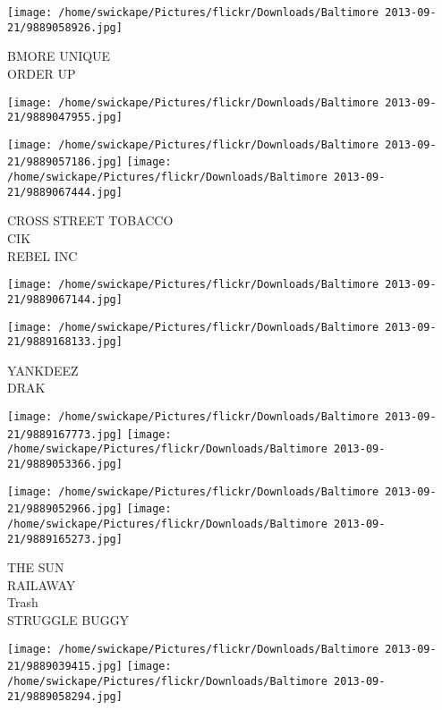 \documentclass[10pt,letterpaper]{article}
\begin{document}
\vspace{0.25in}
\texttt{[image: /home/swickape/Pictures/flickr/Downloads/Baltimore 2013-09-21/9889058926.jpg]}

BMORE UNIQUE\\
ORDER UP\\
\pagebreak

\texttt{[image: /home/swickape/Pictures/flickr/Downloads/Baltimore 2013-09-21/9889047955.jpg]}

\vspace{0.25in}
\texttt{[image: /home/swickape/Pictures/flickr/Downloads/Baltimore 2013-09-21/9889057186.jpg]}
\texttt{[image: /home/swickape/Pictures/flickr/Downloads/Baltimore 2013-09-21/9889067444.jpg]}

CROSS STREET TOBACCO\\
CIK\\
REBEL INC\\
\pagebreak

\texttt{[image: /home/swickape/Pictures/flickr/Downloads/Baltimore 2013-09-21/9889067144.jpg]}

\vspace{0.25in}
\texttt{[image: /home/swickape/Pictures/flickr/Downloads/Baltimore 2013-09-21/9889168133.jpg]}

YANKDEEZ\\
DRAK\\
\pagebreak

\texttt{[image: /home/swickape/Pictures/flickr/Downloads/Baltimore 2013-09-21/9889167773.jpg]}
\texttt{[image: /home/swickape/Pictures/flickr/Downloads/Baltimore 2013-09-21/9889053366.jpg]}

\texttt{[image: /home/swickape/Pictures/flickr/Downloads/Baltimore 2013-09-21/9889052966.jpg]}
\texttt{[image: /home/swickape/Pictures/flickr/Downloads/Baltimore 2013-09-21/9889165273.jpg]}

THE SUN\\
RAILAWAY\\
Trash\\
STRUGGLE BUGGY\\
\pagebreak

\texttt{[image: /home/swickape/Pictures/flickr/Downloads/Baltimore 2013-09-21/9889039415.jpg]}
\texttt{[image: /home/swickape/Pictures/flickr/Downloads/Baltimore 2013-09-21/9889058294.jpg]}
\end{document}
